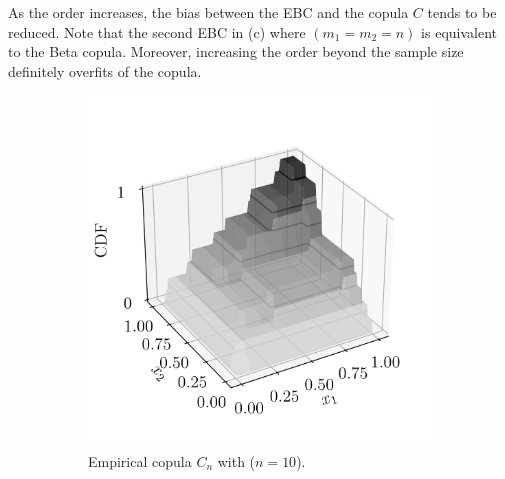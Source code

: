 As the order increases, the bias between the EBC and the copula $C$ tends to be reduced. 
Note that the second EBC in  (c) where $(m_1=m_2=n)$ is equivalent to the Beta copula. 
Moreover, increasing the order beyond the sample size definitely overfits of the copula. 


\begin{figure}
    \begin{subfigure}[b]{0.49\textwidth}
        \centering
        \includegraphics[width=\linewidth]{../numerical_experiments/chapter3/figures/empirical_copula.png}
        \caption{Empirical copula $C_n$ with ($n=10$).}
    \end{subfigure}
    \begin{subfigure}[b]{0.49\textwidth}
        \centering

\end{subfigure}
\end{figure}
